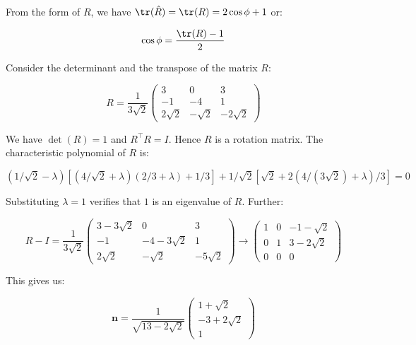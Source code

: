\documentclass[12pt]{article}
\begin{document}
From the form of $R$, we have $\tr(\hat{R}) = \tr(R) = 2\cos{\phi} + 1$ or:

\begin{equation}
    \cos{\phi} = \frac{\tr(R) - 1}{2}
\end{equation}

Consider the determinant and the transpose of the matrix $R$:

\begin{equation}
    R = \frac{1}{3\sqrt{2}} \begin{pmatrix}
        3         & 0         & 3          \\
        -1        & -4        & 1          \\
        2\sqrt{2} & -\sqrt{2} & -2\sqrt{2}
    \end{pmatrix}
\end{equation}

We have $\det(R) = 1$ and $R^{\intercal}R = I$. Hence $R$ is a rotation matrix. The characteristic polynomial of $R$ is:

\begin{equation}
    (1/\sqrt{2} - \lambda)[(4/\sqrt{2} + \lambda)(2/3 + \lambda) + 1/3] + 1/\sqrt{2}[\sqrt{2} + 2(4/(3\sqrt{2}) + \lambda)/3] = 0
\end{equation}

Substituting $\lambda = 1$ verifies that $1$ is an eigenvalue of $R$. Further:

\begin{equation}
    R - I = \frac{1}{3\sqrt{2}} \begin{pmatrix}
        3 - 3\sqrt{2} & 0              & 3          \\
        -1            & -4 - 3\sqrt{2} & 1          \\
        2\sqrt{2}     & -\sqrt{2}      & -5\sqrt{2}
    \end{pmatrix}
    \to
    \begin{pmatrix}
        1 & 0 & -1 - \sqrt{2} \\
        0 & 1 & 3 - 2\sqrt{2} \\
        0 & 0 & 0
    \end{pmatrix}
\end{equation}

This gives us:

\begin{equation}
    \mathbf{n} = \frac{1}{\sqrt{13 - 2\sqrt{2}}}\begin{pmatrix}
        1 + \sqrt{2}   \\
        -3 + 2\sqrt{2} \\
        1
    \end{pmatrix}
\end{equation}
\end{document}
